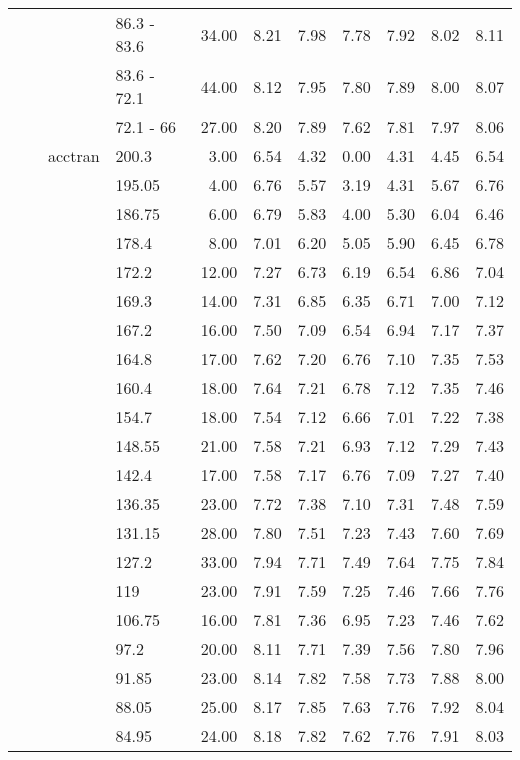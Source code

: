 \begin{longtable}{llllrrrrrrr}
   &  &  & 86.3 - 83.6 & 34.00 & 8.21 & 7.98 & 7.78 & 7.92 & 8.02 & 8.11 \\ 
   &  &  & 83.6 - 72.1 & 44.00 & 8.12 & 7.95 & 7.80 & 7.89 & 8.00 & 8.07 \\ 
   &  &  & 72.1 - 66 & 27.00 & 8.20 & 7.89 & 7.62 & 7.81 & 7.97 & 8.06 \\ 
   &  & acctran & 200.3 & 3.00 & 6.54 & 4.32 & 0.00 & 4.31 & 4.45 & 6.54 \\ 
   &  &  & 195.05 & 4.00 & 6.76 & 5.57 & 3.19 & 4.31 & 5.67 & 6.76 \\ 
   &  &  & 186.75 & 6.00 & 6.79 & 5.83 & 4.00 & 5.30 & 6.04 & 6.46 \\ 
   &  &  & 178.4 & 8.00 & 7.01 & 6.20 & 5.05 & 5.90 & 6.45 & 6.78 \\ 
   &  &  & 172.2 & 12.00 & 7.27 & 6.73 & 6.19 & 6.54 & 6.86 & 7.04 \\ 
   &  &  & 169.3 & 14.00 & 7.31 & 6.85 & 6.35 & 6.71 & 7.00 & 7.12 \\ 
   &  &  & 167.2 & 16.00 & 7.50 & 7.09 & 6.54 & 6.94 & 7.17 & 7.37 \\ 
   &  &  & 164.8 & 17.00 & 7.62 & 7.20 & 6.76 & 7.10 & 7.35 & 7.53 \\ 
   &  &  & 160.4 & 18.00 & 7.64 & 7.21 & 6.78 & 7.12 & 7.35 & 7.46 \\ 
   &  &  & 154.7 & 18.00 & 7.54 & 7.12 & 6.66 & 7.01 & 7.22 & 7.38 \\ 
   &  &  & 148.55 & 21.00 & 7.58 & 7.21 & 6.93 & 7.12 & 7.29 & 7.43 \\ 
   &  &  & 142.4 & 17.00 & 7.58 & 7.17 & 6.76 & 7.09 & 7.27 & 7.40 \\ 
   &  &  & 136.35 & 23.00 & 7.72 & 7.38 & 7.10 & 7.31 & 7.48 & 7.59 \\ 
   &  &  & 131.15 & 28.00 & 7.80 & 7.51 & 7.23 & 7.43 & 7.60 & 7.69 \\ 
   &  &  & 127.2 & 33.00 & 7.94 & 7.71 & 7.49 & 7.64 & 7.75 & 7.84 \\ 
   &  &  & 119 & 23.00 & 7.91 & 7.59 & 7.25 & 7.46 & 7.66 & 7.76 \\ 
   &  &  & 106.75 & 16.00 & 7.81 & 7.36 & 6.95 & 7.23 & 7.46 & 7.62 \\ 
   &  &  & 97.2 & 20.00 & 8.11 & 7.71 & 7.39 & 7.56 & 7.80 & 7.96 \\ 
   &  &  & 91.85 & 23.00 & 8.14 & 7.82 & 7.58 & 7.73 & 7.88 & 8.00 \\ 
   &  &  & 88.05 & 25.00 & 8.17 & 7.85 & 7.63 & 7.76 & 7.92 & 8.04 \\ 
   &  &  & 84.95 & 24.00 & 8.18 & 7.82 & 7.62 & 7.76 & 7.91 & 8.03 \\ 

\end{longtable}
